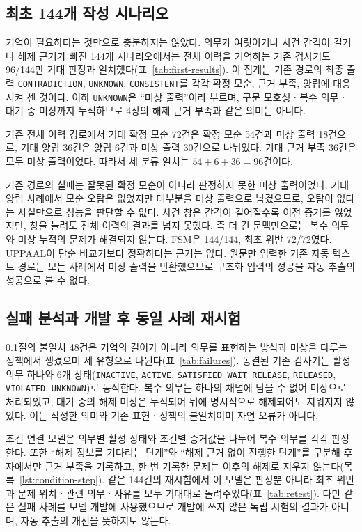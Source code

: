 \begin{revision}
\subsection{최초 144개 작성 시나리오}
\label{sec:first-results}
기억이 필요하다는 것만으로 충분하지는 않았다. 의무가 여럿이거나 사건 간격이 길거나 해제 근거가 빠진 144개 시나리오에서는 전체 이력을 기억하는 기존 검사기도 96/144만 기대 판정과 일치했다(표~\ref{tab:first-results}). 이 집계는 기존 경로의 최종 출력 \texttt{CONTRADICTION}, \texttt{UNKNOWN}, \texttt{CONSISTENT}를 각각 확정 모순, 근거 부족, 양립에 대응시켜 센 것이다. 이하 \texttt{UNKNOWN}은 ``미상 출력''이라 부르며, 구문 모호성ㆍ복수 의무ㆍ대기 중 미상까지 누적하므로 4장의 해제 근거 부족과 같은 의미는 아니다.



기존 전체 이력 경로에서 기대 확정 모순 72건은 확정 모순 54건과 미상 출력 18건으로, 기대 양립 36건은 양립 6건과 미상 출력 30건으로 나뉘었다. 기대 근거 부족 36건은 모두 미상 출력이었다. 따라서 세 분류 일치는 $54+6+36=96$건이다.

기존 경로의 실패는 잘못된 확정 모순이 아니라 판정하지 못한 미상 출력이었다. 기대 양립 사례에서 모순 오탐은 없었지만 대부분을 미상 출력으로 남겼으므로, 오탐이 없다는 사실만으로 성능을 판단할 수 없다. 사건 창은 간격이 길어질수록 이전 증거를 잃었지만, 창을 늘려도 전체 이력의 결과를 넘지 못했다. 즉 더 긴 문맥만으로는 복수 의무와 미상 누적의 문제가 해결되지 않는다. FSM은 144/144, 최초 위반 72/72였다. UPPAAL이 단순 비교기보다 정확하다는 근거는 없다. 원문만 입력한 기존 자동 텍스트 경로는 모든 사례에서 미상 출력을 반환했으므로 구조화 입력의 성공을 자동 추출의 성공으로 볼 수 없다.

\subsection{실패 분석과 개발 후 동일 사례 재시험}
\label{sec:retest-results}
\ref{sec:first-results}절의 불일치 48건은 기억의 길이가 아니라 의무를 표현하는 방식과 미상을 다루는 정책에서 생겼으며 세 유형으로 나뉜다(표~\ref{tab:failures}). 동결된 기존 검사기는 활성 의무 하나와 6개 상태(\texttt{INACTIVE}, \texttt{ACTIVE}, \texttt{SATISFIED\_WAIT\_RELEASE}, \texttt{RELEASED}, \texttt{VIOLATED}, \texttt{UNKNOWN})로 동작한다. 복수 의무는 하나의 채널에 담을 수 없어 미상으로 처리되었고, 대기 중의 해제 미상은 누적되어 뒤에 명시적으로 해제되어도 지워지지 않았다. 이는 작성한 의미와 기존 표현ㆍ정책의 불일치이며 자연 오류가 아니다.

조건 연결 모델은 의무별 활성 상태와 조건별 증거값을 나누어 복수 의무를 각각 판정한다. 또한 ``해제 정보를 기다리는 단계''와 ``해제 근거 없이 진행한 단계''를 구분해 후자에서만 근거 부족을 기록하고, 한 번 기록한 문제는 이후의 해제로 지우지 않는다(목록~\ref{lst:condition-step}). 같은 144건의 재시험에서 이 모델은 판정뿐 아니라 최초 위반과 문제 위치ㆍ관련 의무ㆍ사유를 모두 기대대로 돌려주었다(표~\ref{tab:retest}). 다만 같은 실패 사례를 모델 개발에 사용했으므로 개발에 쓰지 않은 독립 시험의 결과가 아니며, 자동 추출의 개선을 뜻하지도 않는다.


\end{revision}
